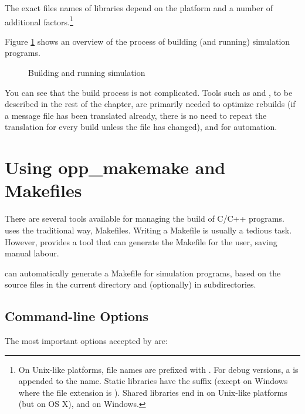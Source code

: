 The exact files names of libraries depend on the platform and a number of
additional factors.\footnote{On Unix-like platforms, file names are
prefixed with . For debug versions, a  is appended to the
name. Static libraries have the  suffix (except on Windows where
the file extension is ). Shared libraries end in  on
Unix-like platforms (but  on OS X), and  on Windows.}

Figure \ref{fig:ch-build:workflow} shows an overview of the process of
building (and running) simulation programs.

\begin{figure}[htbp]
  \begin{center}
    
    \caption{Building and running simulation}
    \label{fig:ch-build:workflow}
  \end{center}
\end{figure}

You can see that the build process is not complicated. Tools such as
 and , to be described in the rest of the
chapter, are primarily needed to optimize rebuilds (if a message file has been
translated already, there is no need to repeat the translation for every build
unless the file has changed), and for automation.
 

\section{Using opp\_makemake and Makefiles}
\label{sec:build-sim-progs:opp-makemake}

There are several tools available for managing the build of C/C++ programs.
{\opp} uses the traditional way, Makefiles. Writing a Makefile is usually a
tedious task. However, {\opp} provides a tool that can generate the
Makefile for the user, saving manual labour.

 can automatically generate a Makefile for simulation
programs, based on the source files in the current directory and (optionally)
in subdirectories.

\subsection{Command-line Options}
\label{sec:build-sim-progs:makemake-options}

The most important options accepted by  are:

